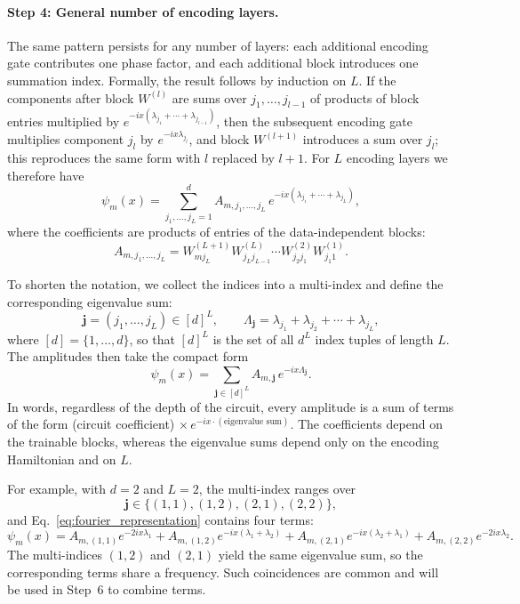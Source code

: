 \documentclass[12pt]{article}
\numberwithin{equation}{section}  %
\begin{document}
\paragraph{Step 4: General number of encoding layers.} The same pattern persists for any number of layers: each additional encoding gate contributes one phase factor, and each additional block introduces one summation index. Formally, the result follows by induction on $L$. If the components after block $W^{(l)}$ are sums over $j_1, \ldots, j_{l-1}$ of products of block entries multiplied by $e^{-ix(\lambda_{j_1}+\cdots+\lambda_{j_{l-1}})}$, then the subsequent encoding gate multiplies component $j_l$ by $e^{-ix\lambda_{j_l}}$, and block $W^{(l+1)}$ introduces a sum over $j_l$; this reproduces the same form with $l$ replaced by $l+1$. For $L$ encoding layers we therefore have
\begin{equation}
\psi_m(x) = \sum_{j_1, \ldots, j_L = 1}^{d} A_{m, j_1, \ldots, j_L}\, e^{-ix(\lambda_{j_1}+\cdots+\lambda_{j_L})},
\end{equation}
where the coefficients are products of entries of the data-independent blocks:
\begin{equation}
A_{m, j_1, \ldots, j_L} = W^{(L+1)}_{m j_L} W^{(L)}_{j_L j_{L-1}} \cdots W^{(2)}_{j_2 j_1} W^{(1)}_{j_1 1}.
\label{eq:coefficients}
\end{equation}

To shorten the notation, we collect the indices into a multi-index and define the corresponding eigenvalue sum:
\begin{equation}
\mathbf{j} = (j_1, \ldots, j_L) \in [d]^L, \qquad
\Lambda_{\mathbf{j}} = \lambda_{j_1} + \lambda_{j_2} + \cdots + \lambda_{j_L},
\end{equation}
where $[d] = \{1, \ldots, d\}$, so that $[d]^L$ is the set of all $d^L$ index tuples of length $L$. The amplitudes then take the compact form
\begin{equation}
\psi_m(x) = \sum_{\mathbf{j} \in [d]^L} A_{m,\mathbf{j}}\, e^{-ix\Lambda_{\mathbf{j}}}.
\label{eq:fourier_representation}
\end{equation}
In words, regardless of the depth of the circuit, every amplitude is a sum of terms of the form (circuit coefficient) $\times\, e^{-ix \cdot (\text{eigenvalue sum})}$. The coefficients depend on the trainable blocks, whereas the eigenvalue sums depend only on the encoding Hamiltonian and on $L$.

For example, with $d = 2$ and $L = 2$, the multi-index ranges over
\begin{equation}
\mathbf{j} \in \{(1,1), (1,2), (2,1), (2,2)\},
\end{equation}
and Eq.~\eqref{eq:fourier_representation} contains four terms:
\begin{equation}
\psi_m(x) = A_{m,(1,1)} e^{-2ix\lambda_1} + A_{m,(1,2)} e^{-ix(\lambda_1+\lambda_2)} + A_{m,(2,1)} e^{-ix(\lambda_2+\lambda_1)} + A_{m,(2,2)} e^{-2ix\lambda_2}.
\end{equation}
The multi-indices $(1,2)$ and $(2,1)$ yield the same eigenvalue sum, so the corresponding terms share a frequency. Such coincidences are common and will be used in Step~6 to combine terms.
\end{document}

